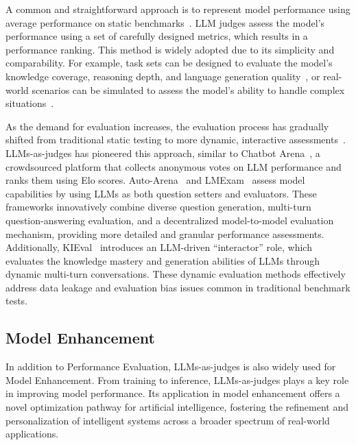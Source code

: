 A common and straightforward approach is to represent model performance using average performance on static benchmarks~\cite{zheng2023judging,lin2024wildbench,tan2024judgebench}. LLM judges assess the model's performance using a set of carefully designed metrics, which results in a performance ranking. This method is widely adopted due to its simplicity and comparability. For example, task sets can be designed to evaluate the model's knowledge coverage, reasoning depth, and language generation quality~\cite{son2024mm,liu2024rm,lambert2024rewardbench}, or real-world scenarios can be simulated to assess the model's ability to handle complex situations~\cite{liu2023agentbench,trivedi2024appworld}.


As the demand for evaluation increases, the evaluation process has gradually shifted from traditional static testing to more dynamic, interactive assessments~\cite{bai2024benchmarking,zhao2024auto,yu2024kieval}.
LLMs-as-judges has pioneered this approach, similar to Chatbot Arena~\cite{zheng2023judging}, a crowdsourced platform that collects anonymous votes on LLM performance and ranks them using Elo scores. 
Auto-Arena~\cite{zhao2024auto,luo2024videoautoarena} and LMExam~\cite{bai2024benchmarking} assess model capabilities by using LLMs as both question setters and evaluators. These frameworks innovatively combine diverse question generation, multi-turn question-answering evaluation, and a decentralized model-to-model evaluation mechanism, providing more detailed and granular performance assessments.
Additionally, KIEval~\cite{yu2024kieval} introduces an LLM-driven ``interactor'' role, which evaluates the knowledge mastery and generation abilities of LLMs through dynamic multi-turn conversations. These dynamic evaluation methods effectively address data leakage and evaluation bias issues common in traditional benchmark tests.



\subsection{Model Enhancement}
\label{sec:Model Enhancement}
In addition to Performance Evaluation, LLMs-as-judges is also widely used for Model Enhancement. From training to inference, LLMs-as-judges plays a key role in improving model performance. Its application in model enhancement offers a novel optimization pathway for artificial intelligence, fostering the refinement and personalization of intelligent systems across a broader spectrum of real-world applications.

